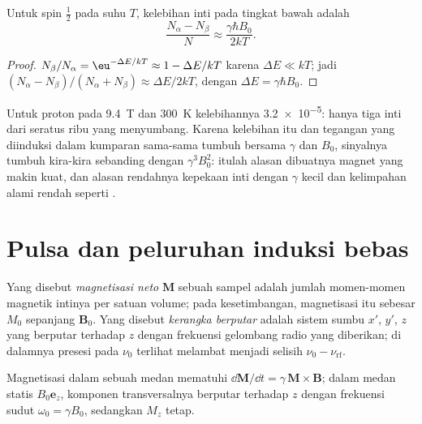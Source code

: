 \begin{proposition}\label{prop:b3:advanced-nmr:populations}
Untuk spin $\frac12$ pada suhu $T$, kelebihan inti pada tingkat bawah adalah
\[
\frac{N_\alpha - N_\beta}{N} \approx \frac{\gamma\hbar B_0}{2kT}.
\]
\end{proposition}

\begin{proof}
$N_\beta/N_\alpha = \eu^{-\Delta E/kT} \approx 1 - \Delta E/kT$ karena
$\Delta E \ll kT$; jadi $(N_\alpha - N_\beta)/(N_\alpha + N_\beta) \approx \Delta E/2kT$,
dengan $\Delta E = \gamma\hbar B_0$.
\end{proof}

Untuk proton pada \qty{9.4}{T} dan \qty{300}{K} kelebihannya \num{3.2e-5}: hanya
tiga inti dari seratus ribu yang menyumbang. Karena kelebihan itu dan
tegangan yang diinduksi dalam kumparan sama-sama tumbuh bersama $\gamma$ dan
$B_0$, sinyalnya tumbuh kira-kira sebanding dengan $\gamma^3B_0^2$: itulah alasan
dibuatnya magnet yang makin kuat, dan alasan rendahnya kepekaan inti dengan
$\gamma$ kecil dan kelimpahan alami rendah seperti .

\section{Pulsa dan peluruhan induksi bebas}

\begin{definition}\label{def:b3:advanced-nmr:magnetisation}
Yang disebut \emph{magnetisasi neto} $\mathbf M$ sebuah
sampel adalah jumlah momen-momen magnetik intinya per satuan volume; pada
kesetimbangan, magnetisasi itu sebesar $M_0$ sepanjang $\mathbf B_0$. Yang
disebut \emph{kerangka berputar} adalah sistem sumbu
$x'$, $y'$, $z$ yang berputar terhadap $z$ dengan frekuensi gelombang radio
yang diberikan; di dalamnya presesi pada $\nu_0$ terlihat melambat menjadi
selisih $\nu_0 -
\nu_{\mathrm{rf}}$.
\end{definition}

\begin{proposition}[Presesi]\label{prop:b3:advanced-nmr:precession}
Magnetisasi dalam sebuah medan mematuhi $\dd\mathbf M/\dd t = \gamma\,\mathbf M\times\mathbf B$;
dalam medan statis $B_0\mathbf e_z$, komponen transversalnya berputar terhadap
$z$ dengan frekuensi sudut $\omega_0 = \gamma B_0$, sedangkan $M_z$ tetap.
\end{proposition}

